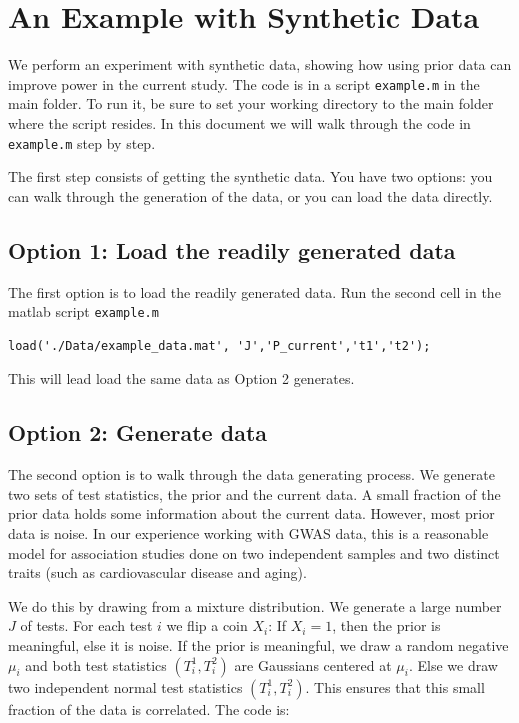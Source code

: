 \documentclass[english,11pt]{article} %
\begin{document}


\section{An Example with Synthetic Data}

We perform an experiment with synthetic data, showing how using prior data can improve power in the current study. The code is in a script \verb+example.m+ in the main folder. To run it, be sure to set your working directory to the main folder where the script resides. In this document we will walk through the code in \verb+example.m+ step by step.

The first step consists of getting the synthetic data. You have two options: you can walk through the generation of the data, or you can load the data directly.

\subsection{Option 1: Load the readily generated data}

The first option is to load the readily generated data. Run the second cell in the matlab script \verb+example.m+

\begin{verbatim}
load('./Data/example_data.mat', 'J','P_current','t1','t2');
\end{verbatim}

This will lead load the same data as Option 2 generates.

\subsection{Option 2: Generate data}

The second option is to walk through the data generating process. We generate two sets of test statistics, the prior and the current data. A small fraction of the prior data holds some information about the current data. However, most prior data is noise. In our experience working with GWAS data, this is a reasonable model for association studies done on two independent samples and two distinct traits (such as cardiovascular disease and aging).

We do this by drawing from a mixture distribution. We generate a large number $J$ of tests. For each test $i$ we flip a coin $X_i$: If $X_i=1$, then the prior is meaningful, else it is noise. If the prior is meaningful, we draw a random negative $\mu_i$ and both test statistics $(T^{1}_i,T^{2}_i)$ are Gaussians centered at $\mu_i$. Else we draw two independent normal test statistics $(T^{1}_i,T^{2}_i)$. This ensures that this small fraction of the data is correlated. The code is:
\end{document}
